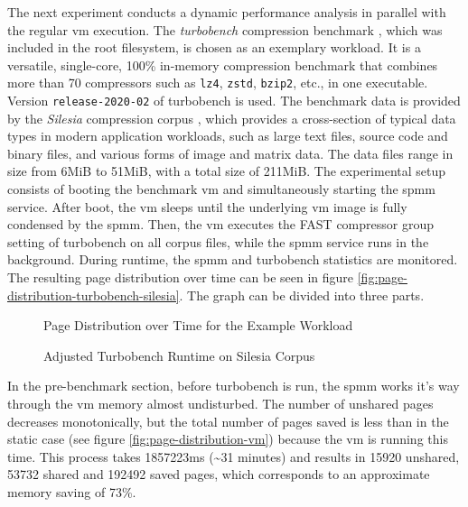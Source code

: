 The next experiment conducts a dynamic performance analysis in parallel with the regular \ac{vm} execution.
The \emph{turbobench} compression benchmark \cite{turbobench}, which was included in the root filesystem, is chosen as an exemplary workload.
It is a versatile, single-core, 100\% in-memory compression benchmark that combines more than 70 compressors such as \texttt{lz4}, \texttt{zstd}, \texttt{bzip2}, etc., in one executable.
Version \texttt{release-2020-02} of turbobench is used.
The benchmark data is provided by the \emph{Silesia} compression corpus \cite{silesia-corpus}, which provides a cross-section of typical data types in modern application workloads, such as large text files, source code and binary files, and various forms of image and matrix data.
The data files range in size from 6MiB to 51MiB, with a total size of 211MiB.
The experimental setup consists of booting the benchmark \ac{vm} and simultaneously starting the \ac{spmm} service.
After boot, the \ac{vm} sleeps until the underlying \ac{vm} image is fully condensed by the \ac{spmm}.
Then, the \ac{vm} executes the FAST compressor group setting of turbobench on all corpus files, while the \ac{spmm} service runs in the background.
During runtime, the \ac{spmm} and turbobench statistics are monitored.
The resulting page distribution over time can be seen in figure \ref{fig:page-distribution-turbobench-silesia}.
The graph can be divided into three parts.

\begin{figure}
  \centering
  
  \caption{Page Distribution over Time for the Example Workload}
  \label{fig:page-distribution-turbobench-silesia}
  \centering
  
  \caption{Adjusted Turbobench Runtime on Silesia Corpus}
  \label{fig:runtime-turbobench-silesia}
\end{figure}

In the pre-benchmark section, before turbobench is run, the \ac{spmm} works it's way through the \ac{vm} memory almost undisturbed.
The number of unshared pages decreases monotonically, but the total number of pages saved is less than in the static case (see figure \ref{fig:page-distribution-vm}) because the \ac{vm} is running this time.
This process takes 1857223ms (\textasciitilde{}31 minutes) and results in 15920 unshared, 53732 shared and 192492 saved pages, which corresponds to an approximate memory saving of 73\%.

